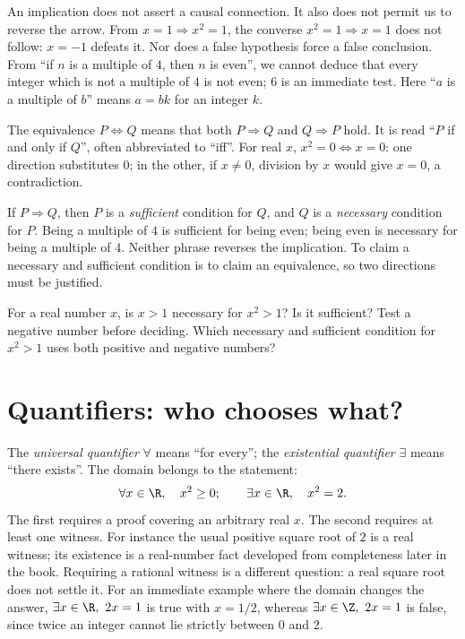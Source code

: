 An implication does not assert a causal connection. It also does not permit us to
reverse the arrow. From $x=1\Rightarrow x^2=1$, the converse $x^2=1\Rightarrow x=1$
does not follow: $x=-1$ defeats it. Nor does a false hypothesis force a false conclusion.
From ``if $n$ is a multiple of $4$, then $n$ is even'', we cannot deduce that every integer
which is not a multiple of $4$ is not even; $6$ is an immediate test.
Here ``$a$ is a multiple of $b$'' means $a=bk$ for an integer $k$.

The equivalence $P\Leftrightarrow Q$ means that both $P\Rightarrow Q$ and $Q\Rightarrow P$
hold. It is read ``$P$ if and only if $Q$'', often abbreviated to ``iff''.
For real $x$, $x^2=0\Leftrightarrow x=0$: one direction substitutes $0$; in the other,
if $x\ne0$, division by $x$ would give $x=0$, a contradiction.

If $P\Rightarrow Q$, then $P$ is a \emph{sufficient} condition for $Q$, and $Q$ is a
\emph{necessary} condition for $P$. Being a multiple of $4$ is sufficient for being even;
being even is necessary for being a multiple of $4$. Neither phrase reverses the implication.
To claim a necessary and sufficient condition is to claim an equivalence, so two directions
must be justified.

\begin{think}
For a real number $x$, is $x>1$ necessary for $x^2>1$? Is it sufficient?
Test a negative number before deciding. Which necessary and sufficient condition
for $x^2>1$ uses both positive and negative numbers?
\end{think}

\section{Quantifiers: who chooses what?}

The \emph{universal quantifier} $\forall$ means ``for every''; the \emph{existential
quantifier} $\exists$ means ``there exists''. The domain belongs to the statement:
\[
\forall x\in\R,\quad x^2\ge0;
\qquad
\exists x\in\R,\quad x^2=2.
\]
The first requires a proof covering an arbitrary real $x$. The second requires at
least one witness. For instance the usual positive square root of $2$ is a real witness;
its existence is a real-number fact developed from completeness later in the book.
Requiring a rational witness is a different question: a real square root does not
settle it. For an immediate example where the domain changes the answer,
$\exists x\in\R,\ 2x=1$ is true with $x=1/2$, whereas
$\exists x\in\Z,\ 2x=1$ is false, since twice an integer cannot lie strictly between $0$ and $2$.

